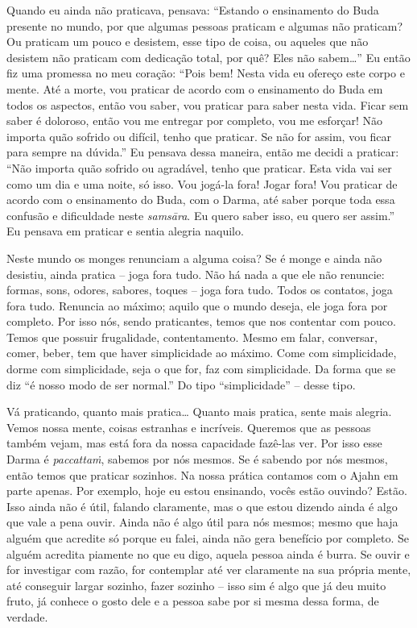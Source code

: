 Quando eu ainda não praticava, pensava: “Estando o ensinamento do
Buda presente no mundo, por que algumas pessoas praticam e algumas não
praticam? Ou praticam um pouco e desistem, esse tipo de coisa, ou
aqueles que não desistem não praticam com dedicação total, por quê?
Eles não sabem\ldots{}” Eu então fiz uma promessa no meu coração: “Pois bem!
Nesta vida eu ofereço este corpo e mente. Até a morte, vou praticar de
acordo com o ensinamento do Buda em todos os aspectos, então vou saber,
vou praticar para saber nesta vida. Ficar sem saber é doloroso, então
vou me entregar por completo, vou me esforçar! Não importa quão sofrido
ou difícil, tenho que praticar. Se não for assim, vou ficar para sempre
na dúvida.” Eu pensava dessa maneira, então me decidi a praticar: “Não
importa quão sofrido ou agradável, tenho que praticar. Esta vida vai
ser como um dia e uma noite, só isso. Vou jogá-la fora! Jogar fora! Vou
praticar de acordo com o ensinamento do Buda, com o Darma, até saber
porque toda essa confusão e dificuldade neste \emph{samsāra}. Eu
quero saber isso, eu quero ser assim.” Eu pensava em praticar e sentia
alegria naquilo. 

Neste mundo os monges renunciam a alguma coisa? Se é monge e ainda
não desistiu, ainda pratica – joga fora tudo. Não há nada a que ele não
renuncie: formas, sons, odores, sabores, toques – joga fora tudo. Todos
os contatos, joga fora tudo. Renuncia ao máximo; aquilo que o mundo
deseja, ele joga fora por completo. Por isso nós, sendo praticantes,
temos que nos contentar com pouco. Temos que possuir frugalidade,
contentamento. Mesmo em falar, conversar, comer, beber, tem que haver
simplicidade ao máximo. Come com simplicidade, dorme com simplicidade,
seja o que for, faz com simplicidade. Da forma que se diz “é nosso modo
de ser normal.” Do tipo “simplicidade” – desse tipo. 

Vá praticando, quanto mais pratica\ldots{} Quanto mais pratica, sente mais
alegria. Vemos nossa mente, coisas estranhas e incríveis. Queremos que
as pessoas também vejam, mas está fora da nossa capacidade fazê-las
ver. Por isso esse Darma é \emph{paccattaṁ}, sabemos por nós mesmos.
Se é sabendo por nós mesmos, então temos que praticar sozinhos. Na
nossa prática contamos com o Ajahn em parte apenas. Por exemplo, hoje
eu estou ensinando, vocês estão ouvindo? Estão. Isso ainda não é útil,
falando claramente, mas o que estou dizendo ainda é algo que vale a
pena ouvir. Ainda não é algo útil para nós mesmos; mesmo que haja
alguém que acredite só porque eu falei, ainda não gera benefício por
completo. Se alguém acredita piamente no que eu digo, aquela pessoa
ainda é burra. Se ouvir e for investigar com razão, for contemplar até
ver claramente na sua própria mente, até conseguir largar sozinho,
fazer sozinho – isso sim é algo que já deu muito fruto, já conhece o
gosto dele e a pessoa sabe por si mesma dessa forma, de verdade. 

